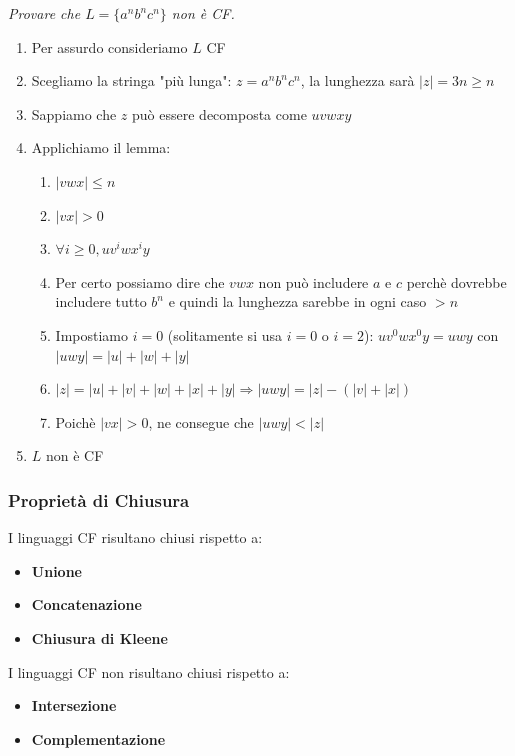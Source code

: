 \documentclass[12pt, a4paper]{report}
\begin{document}
            \begin{example}
                \textit{Provare che $L=\{a^nb^nc^n\}$ non è CF.}
                \begin{enumerate}
                    \item Per assurdo consideriamo $L$ CF
                    \item Scegliamo la stringa "più lunga": $z=a^nb^nc^n$, la lunghezza sarà $|z|=3n\geq n$
                    \item Sappiamo che $z$ può essere decomposta come $uvwxy$
                    \item Applichiamo il lemma: \begin{enumerate}
                        \item $|vwx|\leq n$
                        \item $|vx|>0$
                        \item $\forall i\geq 0, uv^iwx^iy$
                        \item Per certo possiamo dire che $vwx$ non può includere $a$ e $c$ perchè dovrebbe includere tutto $b^n$ e quindi la lunghezza sarebbe in ogni caso $> n$
                        \item Impostiamo $i=0$ (solitamente si usa $i=0$ o $i=2$): $uv^0wx^0y=uwy$ con $|uwy|=|u|+|w|+|y|$
                        \item $|z|=|u|+|v|+|w|+|x|+|y|\Rightarrow |uwy|=|z|-(|v|+|x|)$
                        \item Poichè $|vx|>0$, ne consegue che $|uwy| < |z|$
                    \end{enumerate}
                    \item $L$ non è CF
                \end{enumerate}
            \end{example}
            \subsubsection{Proprietà di Chiusura}
                I linguaggi CF risultano chiusi rispetto a:
                \begin{itemize}
                    \item \textbf{Unione}
                    \item \textbf{Concatenazione}
                    \item \textbf{Chiusura di Kleene}
                \end{itemize}
                I linguaggi CF non risultano chiusi rispetto a:
                \begin{itemize}
                    \item \textbf{Intersezione}
                    \item \textbf{Complementazione}
                \end{itemize}
\end{document}
